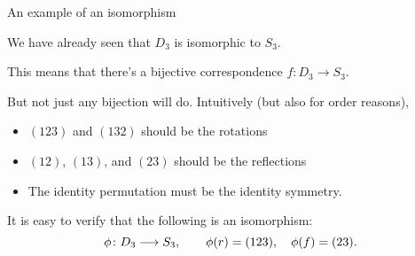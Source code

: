 \documentclass[8pt, handout]{beamer}
\newcommand{\Pause}{\pause}      %
\begin{document}
\begin{frame}{An example of an isomorphism}

  We have already seen that $D_3$ is isomorphic to $S_3$. \medskip\Pause 
  
  This means that there's a bijective correspondence $f\colon D_3\to S_3$. \medskip\Pause
  
  But not just any bijection will do. \Pause Intuitively (but also for order reasons), \smallskip
  \begin{itemize}
  \item $(123)$ and $(132)$ should be the rotations \smallskip\Pause
  \item $(12)$, $(13)$, and $(23)$ should be the reflections \smallskip\Pause
  \item The identity permutation must be the identity symmetry. \smallskip\Pause
  \end{itemize}
  
  It is easy to verify that the following is an isomorphism:
  \[
  \phi\colon D_3\longrightarrow S_3,\qquad \phi(r)=(123),\quad\phi(f)=(23).
  \]
  
  \vspace{-5mm}



\end{frame}
\end{document}

